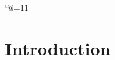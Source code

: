 \makeatletter
\def\cons#1#2{}
\def\car#1{}
\def\cdr#1{}
\def\xmark{}
\def\nil{}
\def\settreesizes{}
\newdimen\treewidth
\def\setsizes{}
\def\inittreewidth{}
\newbox\treebox
\def\tree{}
\def\subtree{}
\def\leaf#1{}
\def\endsubtree{}
\def\endtree{}
\newif\iftreetext\treetextfalse
\def\boxtree{}
\def\ettext{}
\def\makesubtree{}
\def\addsubtreebox{}
\def\subtreebox{}
\def\treectrbox#1{}
\def\treehalfrule{}
\def\makeleaf{}
\def\makeparent{}
\def\sizesubtrees{}
\def\sizelevel{}
\newdimen\treeheight
\newif\ifleaf
\newif\ifbotsub
\newif\iftopsub
\def\typesettree{}
\def\maketree{}
{\catcode`@=11
\gdef\makesubtreebox{}}
\makeatother

\newcommand{\sstack}[1]{}
\newcommand{\nstack}[1]{}
\newcommand{\treeroot}[2]{}
\newcommand{\branch}[2]{}
\newcommand{\LEAF}[1]{}
\newcommand{\treerootf}[2]{}
\newcommand{\branchf}[2]{}
\newcommand{\LEAFf}[1]{}
\renewcommand{\subtreebox}{}
\renewcommand{\makeparent}{}
\renewcommand{\makesubtree}{}

\section{Introduction}
\label{sec:intro}

